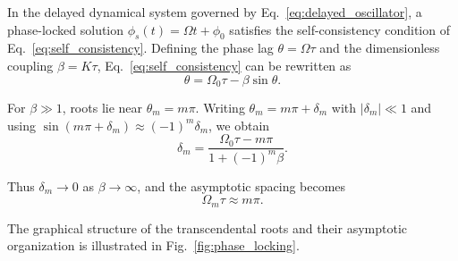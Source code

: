 \documentclass[pdflatex,sn-mathphys-num]{sn-jnl}
\begin{document}
        In the delayed dynamical system governed by Eq.~\ref{eq:delayed_oscillator}, a phase-locked solution $\phi_s(t)=\Omega t+\phi_0$ satisfies the self-consistency condition of Eq.~\ref{eq:self_consistency}. Defining the phase lag $\theta=\Omega\tau$ and the dimensionless coupling $\beta=K\tau$, Eq.~\ref{eq:self_consistency} can be rewritten as
        \begin{equation}
            \theta=\Omega_0\tau-\beta\sin\theta.
            \label{eq:theta_beta}
        \end{equation}

        For $\beta\gg1$, roots lie near $\theta_m=m\pi$. Writing $\theta_m=m\pi+\delta_m$ with $|\delta_m|\ll1$ and using $\sin(m\pi+\delta_m)\approx(-1)^m\delta_m$, we obtain
        \begin{equation}
            \delta_m=\frac{\Omega_0\tau-m\pi}{1+(-1)^m\beta}.
            \label{eq:delta_m}
        \end{equation}

        Thus $\delta_m\to0$ as $\beta\to\infty$, and the asymptotic spacing becomes
        \begin{equation}
            \Omega_m\tau\approx m\pi.
            \label{eq:omega_m_approx}
        \end{equation}

        The graphical structure of the transcendental roots and their asymptotic organization is illustrated in Fig.~\ref{fig:phase_locking}.
\end{document}

